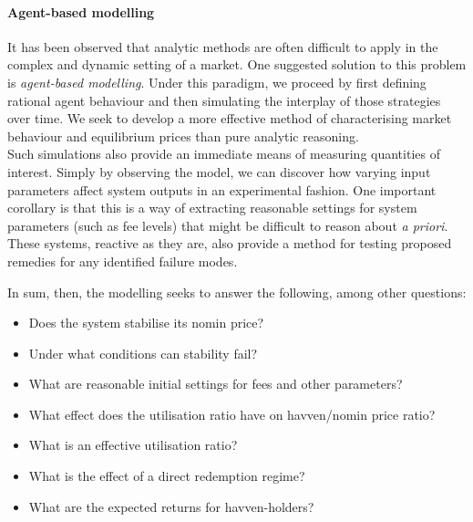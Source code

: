 \paragraph{Agent-based modelling} It has been observed that analytic methods are often difficult to
apply in the complex and dynamic setting of a market.
One suggested solution to this problem is \textit{agent-based modelling}.
Under this paradigm, we proceed by first defining rational agent behaviour
and then simulating the interplay of those strategies over time.
We seek to develop a more effective
method of characterising market behaviour and equilibrium prices than pure analytic reasoning.~\cite{poggio2001agent}\\

\noindent Such simulations also provide an immediate means of measuring
quantities of interest. Simply by observing
the model, we can discover how varying input parameters
affect system outputs in an experimental fashion.
One important corollary is that this is a way of extracting reasonable
settings for system parameters (such as fee levels) that might be difficult
to reason about \textit{a priori}. These systems, reactive as they are,
also provide a method for testing proposed remedies for any identified failure
modes.


\noindent In sum, then, the modelling seeks to answer the following, among other questions:

\begin{itemize}
    \item Does the system stabilise its nomin price?
    \item Under what conditions can stability fail?
    \item What are reasonable initial settings for fees and other parameters?
    \item What effect does the utilisation ratio have on havven/nomin price ratio?
    \item What is an effective utilisation ratio?
    \item What is the effect of a direct redemption regime?
    \item What are the expected returns for havven-holders?
\end{itemize}



